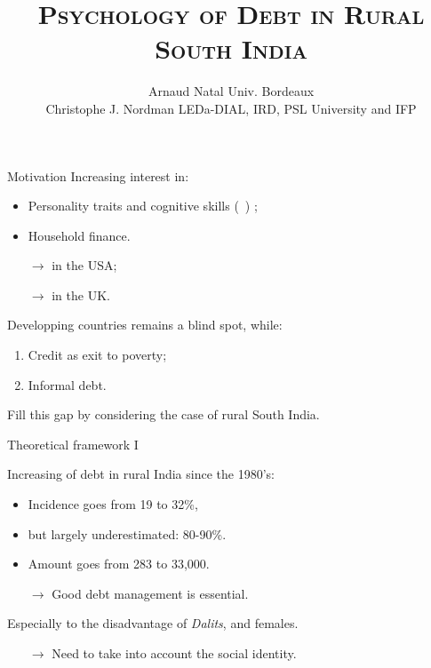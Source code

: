 \documentclass[aspectratio=169]{beamer}
\title[Psychology of debt]{\textsc{Psychology of Debt in Rural South India}}
\author[A. Natal and C.J. Nordman]{\textcolor{ODRIISdarkgreen}{Arnaud Natal\orcidlink{0000-0003-1301-2281}} \textcolor{ODRIISlightgreen}{\scriptsize Univ. Bordeaux} \\ 
\textcolor{ODRIISdarkgreen}{Christophe J. Nordman} \textcolor{ODRIISlightgreen}{\scriptsize LEDa-DIAL, IRD, PSL University and IFP}}
\institute{\\ ICDE | \small \today}
\begin{document}
\maketitle



\begin{frame}{Motivation}
Increasing interest in:
\begin{itemize}
	\item Personality traits and cognitive skills (\PTCS~) \citep{Almlund2011};
	\item Household finance.
	\item[$\rightarrow$] in the USA;
	\item[$\rightarrow$] in the UK.
\end{itemize}

Developping countries remains a blind spot, while:
\begin{enumerate}
	\item Credit as exit to poverty;
	\item Informal debt.
\end{enumerate}

\begin{brickbox}
\centering Fill this gap by considering the case of rural South India.
\end{brickbox}

\end{frame}



\begin{frame}


\end{frame}




\begin{frame}{Theoretical framework I}

Increasing of debt in rural India since the 1980's:
\begin{itemize}
\item Incidence goes from 19 to 32\%, 
\item but largely underestimated: 80-90\%.
\item Amount goes from 283 to 33,000.
\item[$\rightarrow$] Good debt management is essential.%
\end{itemize}


Especially to the disadvantage of \textit{Dalits}, and females.

\begin{itemize}
\item[$\rightarrow$] Need to take into account the social identity.
\end{itemize}

\end{frame}
\end{document}
